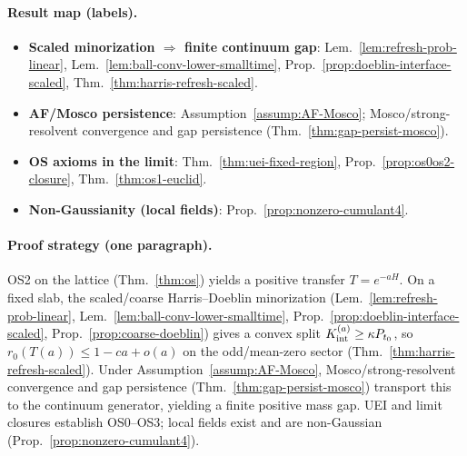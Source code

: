 \documentclass[11pt]{amsart}
\theoremstyle{plain}
\theoremstyle{definition}
\theoremstyle{remark}
\begin{document}
\paragraph{Result map (labels).}
\begin{itemize}
  \item \textbf{Scaled minorization $\Rightarrow$ finite continuum gap}: Lem.~\ref{lem:refresh-prob-linear}, Lem.~\ref{lem:ball-conv-lower-smalltime}, Prop.~\ref{prop:doeblin-interface-scaled}, Thm.~\ref{thm:harris-refresh-scaled}.
  \item \textbf{AF/Mosco persistence}: Assumption~\ref{assump:AF-Mosco}; Mosco/strong-resolvent convergence and gap persistence (Thm.~\ref{thm:gap-persist-mosco}).
  \item \textbf{OS axioms in the limit}: Thm.~\ref{thm:uei-fixed-region}, Prop.~\ref{prop:os0os2-closure}, Thm.~\ref{thm:os1-euclid}.
  \item \textbf{Non-Gaussianity (local fields)}: Prop.~\ref{prop:nonzero-cumulant4}.
\end{itemize}

\paragraph{Proof strategy (one paragraph).}
OS2 on the lattice (Thm.~\ref{thm:os}) yields a positive transfer $T=e^{-aH}$. On a fixed slab, the scaled/coarse Harris--Doeblin minorization (Lem.~\ref{lem:refresh-prob-linear}, Lem.~\ref{lem:ball-conv-lower-smalltime}, Prop.~\ref{prop:doeblin-interface-scaled}, Prop.~\ref{prop:coarse-doeblin}) gives a convex split $K_{\rm int}^{(a)}\ge \kappa P_{t_0}$, so $r_0(T(a))\le 1-c a+o(a)$ on the odd/mean-zero sector (Thm.~\ref{thm:harris-refresh-scaled}). Under Assumption~\ref{assump:AF-Mosco}, Mosco/strong-resolvent convergence and gap persistence (Thm.~\ref{thm:gap-persist-mosco}) transport this to the continuum generator, yielding a finite positive mass gap. UEI and limit closures establish OS0--OS3; local fields exist and are non-Gaussian (Prop.~\ref{prop:nonzero-cumulant4}).
\end{document}
